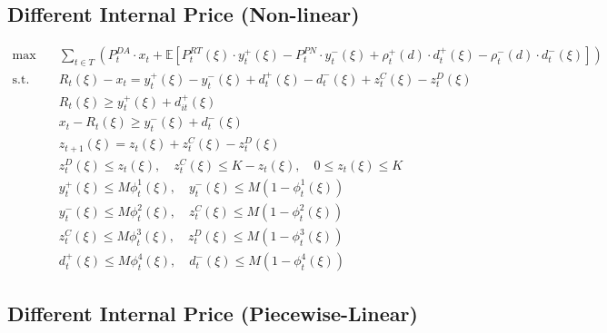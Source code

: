 \documentclass[10pt]{article}
\begin{document}
\subsection{Different Internal Price (Non-linear)}
\begin{subequations}
    \begin{align}
        \text{max} \quad &\sum_{t\in T}\left(P_t^{DA} \cdot x_{t} + \mathbb{E}\left[P_t^{RT}(\xi) \cdot y^+_{t}(\xi) - P_t^{PN} \cdot y^-_{t}(\xi) + \rho^+_t(d) \cdot d^+_{t}(\xi) - \rho^-_t(d) \cdot d^-_{t}(\xi)\right]\right)&\\   
        \text{s.t.} \quad &R_{t}(\xi) - x_{t} = y_{t}^{+}(\xi) - y_{t}^{-}(\xi) + d^+_{t}(\xi) - d^-_{t}(\xi) + z^C_{t}(\xi) - z^D_{t}(\xi) &\\
        & R_{t}(\xi) \geq y^+_t(\xi) + d^+_{it}(\xi)&\\
        & x_{t} - R_{t}(\xi) \geq y^-_{t}(\xi) + d^-_{t}(\xi)&\\
        &z_{t+1}(\xi) = z_{t}(\xi) + z^C_{t}(\xi) - z^D_{t}(\xi)&\\
        &z^D_{t}(\xi) \le z_{t}(\xi), \quad z^C_{t}(\xi) \le K - z_{t}(\xi), \quad 0 \leq z_{t}(\xi) \leq K &\\
        &y^+_{t}(\xi) \leq M \phi^1_{t}(\xi), \quad y^-_{t}(\xi) \leq M (1 - \phi^1_{t}(\xi)) &\\
        &y^-_{t}(\xi) \leq M \phi^2_{t}(\xi), \quad z^C_{t}(\xi) \leq M (1 - \phi^2_{t}(\xi)) &\\
        &z^C_{t}(\xi) \leq M \phi^3_{t}(\xi), \quad z^D_{t}(\xi) \leq M (1 - \phi^3_{t}(\xi)) &\\
        &d^+_{t}(\xi) \leq M \phi^4_{t}(\xi), \quad d^-_{t}(\xi) \leq M (1 - \phi^4_{t}(\xi))&
    \end{align}
\end{subequations}

\subsection{Different Internal Price (Piecewise-Linear)}
\end{document}
